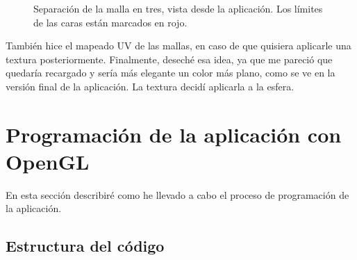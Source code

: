 \documentclass[a4paper,12pt]{article}
\begin{document}
\begin{figure}[h]
    \centering
    \caption{Separación de la malla en tres, vista desde la aplicación. Los límites de las caras están marcados en rojo.} \label{separacion_caras_triangulo}
\end{figure}

También hice el mapeado UV de las mallas, en caso de que quisiera aplicarle una textura posteriormente. Finalmente, deseché esa idea, ya que me pareció que quedaría recargado y sería más elegante un color más plano, como se ve en la versión final de la aplicación. La textura decidí aplicarla a la esfera.

\section{Programación de la aplicación con OpenGL}

En esta sección describiré como he llevado a cabo el proceso de programación de la aplicación.

\subsection{Estructura del código}
\end{document}
